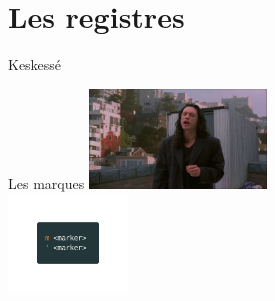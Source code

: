 \documentclass[10pt]{beamer}
\begin{document}
\section{Les registres}
	\begin{frame}{Keskessé}
	\end{frame}

	\begin{frame}{Les marques}
		\center
		\includegraphics[height=100]{img/mark.jpeg}\\
		\includegraphics[height=100]{img/markers.png}
	\end{frame}
\end{document}
